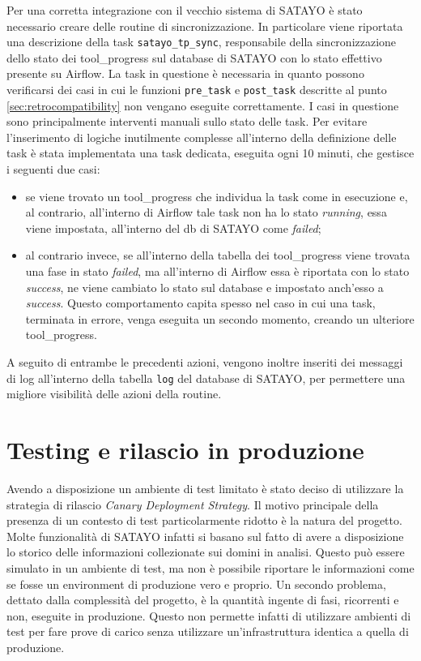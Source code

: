 Per una corretta integrazione con il vecchio sistema di SATAYO è stato necessario
creare delle routine di sincronizzazione. In particolare viene riportata una
descrizione della task \texttt{satayo\_tp\_sync}, responsabile della
sincronizzazione dello stato dei tool\_progress sul database di SATAYO con lo
stato effettivo presente su Airflow. La task in questione è necessaria in quanto
possono verificarsi dei casi in cui le funzioni \texttt{pre\_task} e \texttt{post\_task}
descritte al punto \ref{sec:retrocompatibility} non vengano eseguite correttamente.
I casi in questione sono principalmente interventi manuali sullo stato delle
task. Per evitare l'inserimento di logiche inutilmente complesse all'interno della
definizione delle task è stata implementata una task dedicata, eseguita ogni 10
minuti, che gestisce i seguenti due casi:

\begin{itemize}
  \item se viene trovato un tool\_progress che individua la task come in esecuzione
    e, al contrario, all'interno di Airflow tale task non ha lo stato \textit{running},
    essa viene impostata, all'interno del db di SATAYO come \textit{failed};

  \item al contrario invece, se all'interno della tabella dei tool\_progress
    viene trovata una fase in stato \textit{failed}, ma all'interno di Airflow
    essa è riportata con lo stato \textit{success}, ne viene cambiato lo stato
    sul database e impostato anch'esso a \textit{success}. Questo comportamento
    capita spesso nel caso in cui una task, terminata in errore, venga eseguita
    un secondo momento, creando un ulteriore tool\_progress.
\end{itemize}

A seguito di entrambe le precedenti azioni, vengono inoltre inseriti dei messaggi
di log all'interno della tabella \texttt{log} del database di SATAYO, per permettere
una migliore visibilità delle azioni della routine.

\section{Testing e rilascio in produzione}
\label{sec:deployment}

Avendo a disposizione un ambiente di test limitato è stato deciso di utilizzare
la strategia di rilascio \textit{Canary Deployment Strategy}\cite{humble2010continuous}.
Il motivo principale della presenza di un contesto di test particolarmente ridotto
è la natura del progetto. Molte funzionalità di SATAYO infatti si basano sul
fatto di avere a disposizione lo storico delle informazioni collezionate sui
domini in analisi. Questo può essere simulato in un ambiente di test, ma non è
possibile riportare le informazioni come se fosse un environment di produzione
vero e proprio. Un secondo problema, dettato dalla complessità del progetto, è la
quantità ingente di fasi, ricorrenti e non, eseguite in produzione. Questo non
permette infatti di utilizzare ambienti di test per fare prove di carico senza
utilizzare un'infrastruttura identica a quella di produzione.

